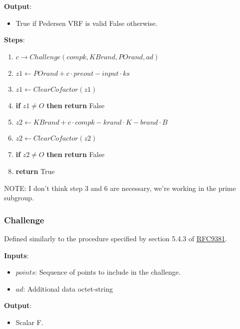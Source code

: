 \documentclass[
]{article}
\providecommand{\tightlist}{%
  \setlength{\itemsep}{0pt}\setlength{\parskip}{0pt}}
\begin{document}
\textbf{Output}:

\begin{itemize}
\tightlist
\item
  True if Pedersen VRF is valid False otherwise.
\end{itemize}

\textbf{Steps}:

\begin{enumerate}
\def\labelenumi{\arabic{enumi}.}
\tightlist
\item
  \(c \rightarrow Challenge(compk, KBrand, POrand, ad)\)
\item
  \(z1 \leftarrow POrand + c \cdot preout - input \cdot ks\)
\item
  \(z1 \leftarrow ClearCofactor(z1)\)
\item
  \textbf{if} \(z1 \neq O\) \textbf{then} \textbf{return} False
\item
  \(z2 \leftarrow KBrand + c \cdot compk - krand \cdot K - brand \cdot B\)
\item
  \(z2 \leftarrow ClearCofactor(z2)\)
\item
  \textbf{if} \(z2 \neq O\) \textbf{then} \textbf{return} False
\item
  \textbf{return} True
\end{enumerate}

NOTE: I don't think step 3 and 6 are necessary, we're working in the
prime subgroup.

\hypertarget{challenge}{%
\subsubsection{Challenge}\label{challenge}}

Defined similarly to the procedure specified by section 5.4.3 of
\href{https://datatracker.ietf.org/doc/rfc9381/}{RFC9381}.

\textbf{Inputs}:

\begin{itemize}
\tightlist
\item
  \(points\): Sequence of points to include in the challenge.
\item
  \(ad\): Additional data octet-string
\end{itemize}

\textbf{Output}:

\begin{itemize}
\tightlist
\item
  Scalar \in F.
\end{itemize}
\end{document}
